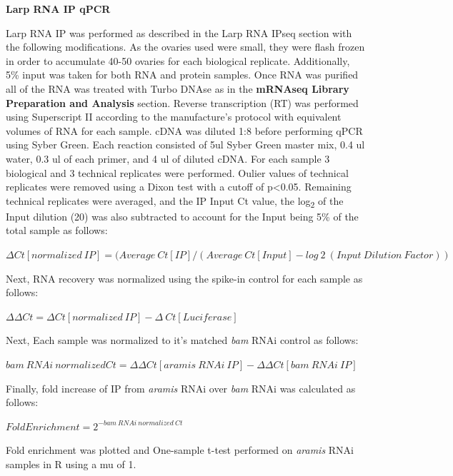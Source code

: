 \documentclass[12pt,oneside]{reedthesis}
\begin{document}
\textbf{Larp RNA IP qPCR}

Larp RNA IP was performed as described in the Larp RNA IPseq section
with the following modifications. As the ovaries used were small, they
were flash frozen in order to accumulate 40-50 ovaries for each
biological replicate. Additionally, 5\% input was taken for both RNA and
protein samples. Once RNA was purified all of the RNA was treated with
Turbo DNAse as in the \textbf{mRNAseq Library Preparation and
Analysis} section. Reverse transcription (RT) was performed using
Superscript II according to the manufacture's protocol with equivalent
volumes of RNA for each sample. cDNA was diluted 1:8 before performing
qPCR using Syber Green. Each reaction consisted of 5ul Syber Green
master mix, 0.4 ul water, 0.3 ul of each primer, and 4 ul of diluted
cDNA. For each sample 3 biological and 3 technical replicates were
performed. Oulier values of technical replicates were removed using a
Dixon test with a cutoff of p\textless0.05. Remaining technical replicates were
averaged, and the IP Input Ct value, the log\textsubscript{2} of the Input dilution
(20) was also subtracted to account for the Input being 5\% of the total
sample as follows:

\textbf{\hfill\break
}

\(\Delta Ct[normalized\ IP] = (Average\ Ct[IP]/(Average\ Ct[Input] - log~2~(Input\ Dilution\ Factor))\)

\textbf{\hfill\break
}

Next, RNA recovery was normalized using the spike-in control for each
sample as follows:

\textbf{\hfill\break
}

\(\Delta \Delta Ct = \Delta Ct[normalized\ IP]-\Delta\ Ct[Luciferase]\)

\textbf{\hfill\break
}

Next, Each sample was normalized to it's matched \emph{bam} RNAi control as
follows:

\textbf{\hfill\break
}

\(bam\ RNAi\ normalized Ct= \Delta \Delta Ct[aramis\ RNAi\ IP] - \Delta \Delta Ct[bam\ RNAi\ IP]\)

Finally, fold increase of IP from \emph{aramis} RNAi over \emph{bam} RNAi was
calculated as follows:

\textbf{\hfill\break
}

\(Fold Enrichment = 2^{-bam\ RNAi\ normalized\ Ct}\)

\textbf{\hfill\break
}

Fold enrichment was plotted and One-sample t-test performed on \emph{aramis}
RNAi samples in R using a mu of 1.
\end{document}
